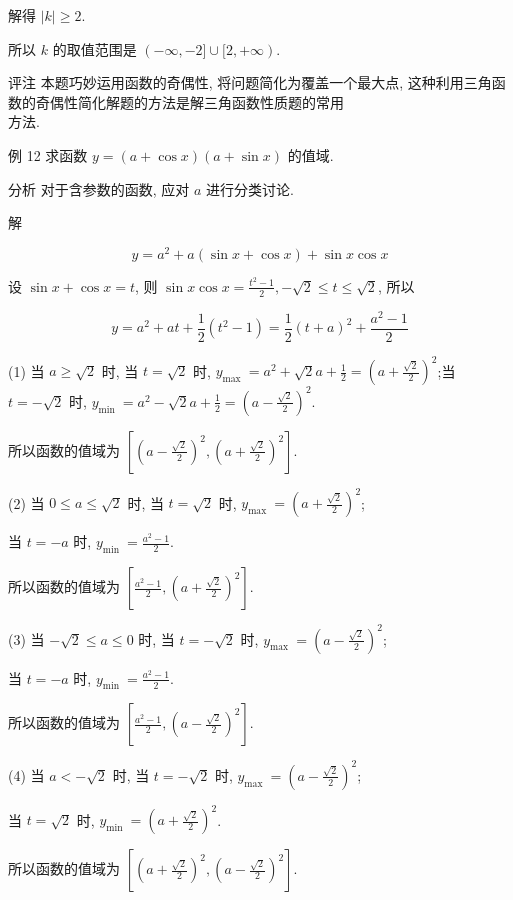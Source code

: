 	解得 $|k| \geqslant 2$.

	所以 $k$ 的取值范围是 $(-\infty,-2] \cup[2,+\infty)$.

	评注 本题巧妙运用函数的奇偶性, 将问题简化为覆盖一个最大点, 这种利用三角函数的奇偶性简化解题的方法是解三角函数性质题的常用\\
	方法.

	例 12 求函数 $y=(a+\cos x)(a+\sin x)$ 的值域.

	分析 对于含参数的函数, 应对 $a$ 进行分类讨论.

	解

	$$
		y=a^{2}+a(\sin x+\cos x)+\sin x \cos x
	$$

	设 $\sin x+\cos x=t$, 则 $\sin x \cos x=\frac{t^{2}-1}{2},-\sqrt{2} \leqslant t \leqslant \sqrt{2}$, 所以

	$$
		y=a^{2}+a t+\frac{1}{2}\left(t^{2}-1\right)=\frac{1}{2}(t+a)^{2}+\frac{a^{2}-1}{2}
	$$

	(1) 当 $a \geqslant \sqrt{2}$ 时, 当 $t=\sqrt{2}$ 时, $y_{\text {max }}=a^{2}+\sqrt{2} a+\frac{1}{2}=\left(a+\frac{\sqrt{2}}{2}\right)^{2}$;当 $t=-\sqrt{2}$ 时, $y_{\text {min }}=a^{2}-\sqrt{2} a+\frac{1}{2}=\left(a-\frac{\sqrt{2}}{2}\right)^{2}$.

	所以函数的值域为 $\left[\left(a-\frac{\sqrt{2}}{2}\right)^{2},\left(a+\frac{\sqrt{2}}{2}\right)^{2}\right]$.

	(2) 当 $0 \leqslant a \leqslant \sqrt{2}$ 时, 当 $t=\sqrt{2}$ 时, $y_{\text {max }}=\left(a+\frac{\sqrt{2}}{2}\right)^{2}$;

	当 $t=-a$ 时, $y_{\text {min }}=\frac{a^{2}-1}{2}$.

	所以函数的值域为 $\left[\frac{a^{2}-1}{2},\left(a+\frac{\sqrt{2}}{2}\right)^{2}\right]$.

	(3) 当 $-\sqrt{2} \leqslant a \leqslant 0$ 时, 当 $t=-\sqrt{2}$ 时, $y_{\text {max }}=\left(a-\frac{\sqrt{2}}{2}\right)^{2}$;

	当 $t=-a$ 时, $y_{\text {min }}=\frac{a^{2}-1}{2}$.

	所以函数的值域为 $\left[\frac{a^{2}-1}{2},\left(a-\frac{\sqrt{2}}{2}\right)^{2}\right]$.

	(4) 当 $a<-\sqrt{2}$ 时, 当 $t=-\sqrt{2}$ 时, $y_{\text {max }}=\left(a-\frac{\sqrt{2}}{2}\right)^{2}$;

	当 $t=\sqrt{2}$ 时, $y_{\text {min }}=\left(a+\frac{\sqrt{2}}{2}\right)^{2}$.

	所以函数的值域为 $\left[\left(a+\frac{\sqrt{2}}{2}\right)^{2},\left(a-\frac{\sqrt{2}}{2}\right)^{2}\right]$.

